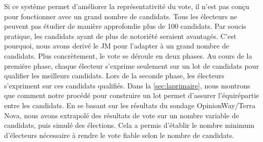 \documentclass[conference]{IEEEtran}
\begin{document}
Si ce syst\`eme permet d'am\'eliorer la repr\'esentativit\'e du vote, il n'est pas con\c{c}u pour fonctionner avec un grand nombre de candidats. Tous les \'electeurs ne peuvent pas \'etudier de mani\`ere approfondie plus de 100 candidats. Par soucis pratique, les candidats ayant de plus de notori\'et\'e seraient avantag\'es. C'est pourquoi, nous avons deriv\'e le JM pour l'adapter \`a un grand nombre de candidats. Plus concr\`etement,
le vote se d\'eroule en deux phases. Au cours de la premi\'ere phase, chaque \'electeur s'exprime seulement sur un lot de candidats pour qualifier les meilleurs candidats. Lors de la seconde phase, les \'electeurs s'expriment sur ces candidats qualifi\'es.
Dans la \cref{sec:laprimaire}, nous montrons que comment notre proc\'ed\'e pour construire un lot permet d'assurer l'\'equir\'epartie entre les candidats. En se basant sur les r\'esultats du sondage OpinionWay/Terra Nova, nous avons extrapol\'e des r\'esultats de vote sur un nombre variable de candidats, puis simul\'e des \'elections. Cela a permis d'\'etablir le nombre minimum d'\'electeurs n\'ecessaire \`a rendre le vote fiable selon le nombre de candidats.
\end{document}
